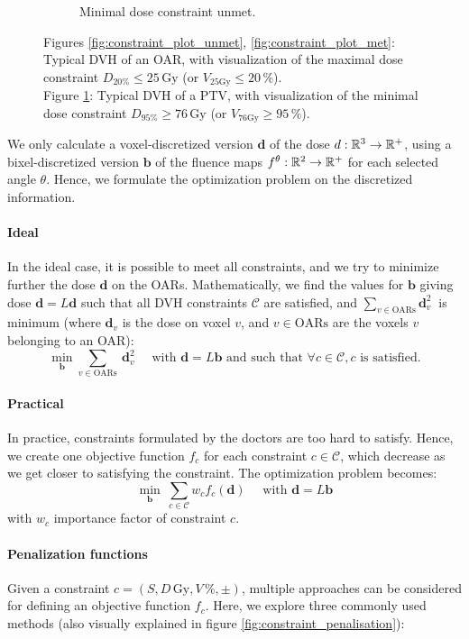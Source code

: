 \begin{figure}
\begin{subfigure}{0.32\textwidth}
		\caption{Minimal dose constraint unmet.}
		\label{fig:constraint_plot_min}
	\end{subfigure}
	\caption*{
		Figures \ref{fig:constraint_plot_unmet}, \ref{fig:constraint_plot_met}:
		Typical DVH of an OAR, with visualization of the maximal dose constraint $D_{20\%} \leq 25\,\text{Gy}$ (or $V_{25\text{Gy}} \leq 20\,\%$).\\
		Figure \ref{fig:constraint_plot_min}:
		Typical DVH of a PTV, with visualization of the minimal dose constraint $D_{95\%} \geq 76\,\text{Gy}$ (or $V_{76\text{Gy}} \geq 95\,\%$).
	}
	\label{fig:constraint_plot}
\end{figure}

We only calculate a voxel-discretized version $\mathbf{d}$ of the dose $d: \mathbb{R}^3 \to \mathbb{R}^+$, using a bixel-discretized version $\mathbf{b}$ of the fluence maps $f^\theta: \mathbb{R}^2 \to \mathbb{R}^+$ for each selected angle $\theta$.
Hence, we formulate the optimization problem on the discretized information.

\paragraph{Ideal}
In the ideal case, it is possible to meet all constraints, and we try to minimize further the dose $\mathbf{d}$ on the OARs.
Mathematically, we find the values for $\mathbf{b}$ giving dose $\mathbf{d} = L\mathbf{d}$ such that all DVH constraints $\mathcal{C}$ are satisfied, and $\sum_{v \in \text{OARs}} \mathbf{d}_v^2 \ $ is minimum (where $\mathbf{d}_v$ is the dose on voxel $v$, and $v \in \text{OARs}$ are the voxels $v$ belonging to an OAR):
$$
\min_{\mathbf{b}} \sum_{v \in \text{OARs}} \ \mathbf{d}_v^2
\quad \text{ with }
\mathbf{d} = L\mathbf{b}
\text{ and such that }
\forall c \in \mathcal{C}, c \text{ is satisfied.}
$$

\paragraph{Practical}
In practice, constraints formulated by the doctors are too hard to satisfy.
Hence, we create one objective function $f_c$ for each constraint $c \in \mathcal{C}$, which decrease as we get closer to satisfying the constraint.
The optimization problem becomes:
$$
\min_{\mathbf{b}} \ \sum_{c \in \mathcal{C}} w_c f_c(\mathbf{d})
\quad \text{ with }
\mathbf{d} = L\mathbf{b}
$$
with $w_c$ importance factor of constraint $c$.

\paragraph{Penalization functions}
Given a constraint $c = \left( S, D\,\text{Gy}, V\,\%, \pm \right)$, multiple approaches can be considered for defining an objective function \( f_c \).
Here, we explore three commonly used methods (also visually explained in figure \ref{fig:constraint_penalisation}):


